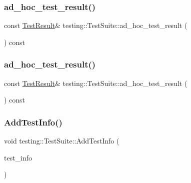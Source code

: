\subsubsection{\texorpdfstring{ad\_hoc\_test\_result()}{ad\_hoc\_test\_result()}\hspace{0.1cm}{\footnotesize\ttfamily [1/2]}}
{\footnotesize\ttfamily const \mbox{\hyperlink{classtesting_1_1_test_result}{Test\+Result}}\& testing\+::\+Test\+Suite\+::ad\+\_\+hoc\+\_\+test\+\_\+result (\begin{DoxyParamCaption}{ }\end{DoxyParamCaption}) const\hspace{0.3cm}{\ttfamily [inline]}}

\mbox{\label{classtesting_1_1_test_suite_a3391a0ec111c66e1ac16a800f5068af7}} 
\subsubsection{\texorpdfstring{ad\_hoc\_test\_result()}{ad\_hoc\_test\_result()}\hspace{0.1cm}{\footnotesize\ttfamily [2/2]}}
{\footnotesize\ttfamily const \mbox{\hyperlink{classtesting_1_1_test_result}{Test\+Result}}\& testing\+::\+Test\+Suite\+::ad\+\_\+hoc\+\_\+test\+\_\+result (\begin{DoxyParamCaption}{ }\end{DoxyParamCaption}) const\hspace{0.3cm}{\ttfamily [inline]}}

\mbox{\label{classtesting_1_1_test_suite_a9d8d94a589481923b7cf6c7ce3a48f8b}} 
\subsubsection{\texorpdfstring{AddTestInfo()}{AddTestInfo()}\hspace{0.1cm}{\footnotesize\ttfamily [1/2]}}
{\footnotesize\ttfamily void testing\+::\+Test\+Suite\+::\+Add\+Test\+Info (\begin{DoxyParamCaption}\item[{\mbox{\hyperlink{classtesting_1_1_test_info}{Test\+Info}} $\ast$}]{test\+\_\+info }\end{DoxyParamCaption})\hspace{0.3cm}{\ttfamily [private]}}

